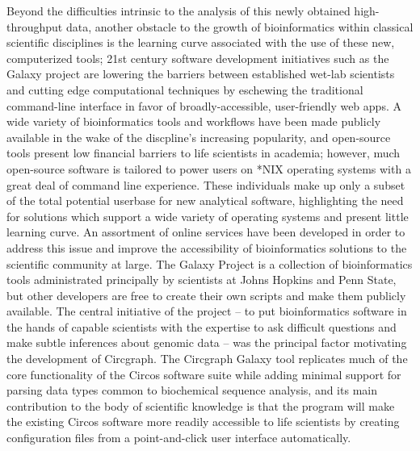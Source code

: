 \documentclass[twocolumn]{article}
\begin{document}
Beyond the difficulties intrinsic to the analysis of this newly obtained high-throughput data, another obstacle to the growth of bioinformatics within classical scientific disciplines is the learning curve associated with the use of these new, computerized tools; 21st century software development initiatives such as the Galaxy project are lowering the barriers between established wet-lab scientists and cutting edge computational techniques by eschewing the traditional command-line interface in favor of broadly-accessible, user-friendly web apps. A wide variety of bioinformatics tools and workflows have been made publicly available in the wake of the discpline's increasing popularity, and open-source tools present low financial barriers to life scientists in academia; however, much open-source software is tailored to power users on *NIX operating systems with a great deal of command line experience. These individuals make up only a subset of the total potential userbase for new analytical software, highlighting the need for solutions which support a wide variety of operating systems and present little learning curve. An assortment of online services have been developed in order to address this issue and improve the accessibility of bioinformatics solutions to the scientific community at large. The Galaxy Project is a collection of bioinformatics tools administrated principally by scientists at Johns Hopkins and Penn State, but other developers are free to create their own scripts and make them publicly available. The central initiative of the project -- to put bioinformatics software in the hands of capable scientists with the expertise to ask difficult questions and make subtle inferences about genomic data -- was the principal factor motivating the development of Circgraph. The Circgraph Galaxy tool replicates much of the core functionality of the Circos software suite while adding minimal support for parsing data types common to biochemical sequence analysis, and its main contribution to the body of scientific knowledge is that the program will make the existing Circos software more readily accessible to life scientists by creating configuration files from a point-and-click user interface automatically.  
\end{document}
